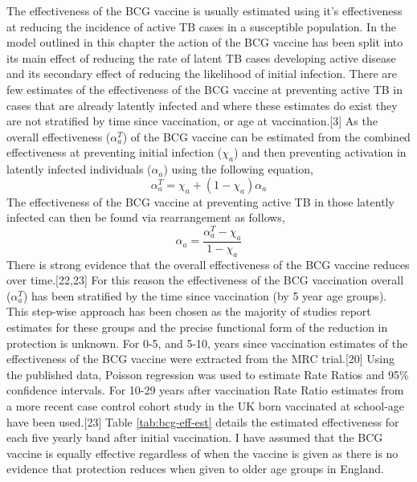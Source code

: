 \documentclass[11pt,twoside]{bristolthesis}
\begin{document}
  The effectiveness of the BCG vaccine is usually estimated using it's effectiveness at reducing the incidence of active TB cases in a susceptible population. In the model outlined in this chapter the action of the BCG vaccine has been split into its main effect of reducing the rate of latent TB cases developing active disease and its secondary effect of reducing the likelihood of initial infection. There are few estimates of the effectiveness of the BCG vaccine at preventing active TB in cases that are already latently infected and where these estimates do exist they are not stratified by time since vaccination, or age at vaccination.{[}3{]} As the overall effectiveness (\(\alpha^T_a\)) of the BCG vaccine can be estimated from the combined effectiveness at preventing initial infection (\(\chi_a\)) and then preventing activation in latently infected individuals (\(\alpha_a\)) using the following equation,
  \begin{equation}
    \alpha^T_a = \chi_a + (1 - \chi_a) \alpha_a
    \label{eq:full-bcg-effectiveness}
  \end{equation}
  The effectiveness of the BCG vaccine at preventing active TB in those latently infected can then be found via rearrangement as follows,
  \begin{equation}
    \alpha_a = \frac{\alpha^T_a - \chi_a}{1 - \chi_a}
    \label{eq:latent-active-bcg-effectiveness}
  \end{equation}
  There is strong evidence that the overall effectiveness of the BCG vaccine reduces over time.{[}22,23{]} For this reason the effectiveness of the BCG vaccination overall (\(\alpha^T_a\)) has been stratified by the time since vaccination (by 5 year age groups). This step-wise approach has been chosen as the majority of studies report estimates for these groups and the precise functional form of the reduction in protection is unknown. For 0-5, and 5-10, years since vaccination estimates of the effectiveness of the BCG vaccine were extracted from the MRC trial.{[}20{]} Using the published data, Poisson regression was used to estimate Rate Ratios and 95\% confidence intervals. For 10-29 years after vaccination Rate Ratio estimates from a more recent case control cohort study in the UK born vaccinated at school-age have been used.{[}23{]} Table \ref{tab:bcg-eff-est} details the estimated effectiveness for each five yearly band after initial vaccination. I have assumed that the BCG vaccine is equally effective regardless of when the vaccine is given as there is no evidence that protection reduces when given to older age groups in England.
\end{document}
